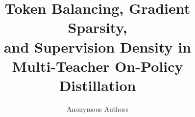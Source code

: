 \documentclass{article} %
\title{Token Balancing, Gradient Sparsity,\\and Supervision Density in\\Multi-Teacher On-Policy Distillation}
\author{Anonymous Authors}
\theoremstyle{remark}
\begin{document}
\maketitle














\appendix

\setcounter{table}{0}
\renewcommand{\thetable}{A\arabic{table}}



\end{document}
